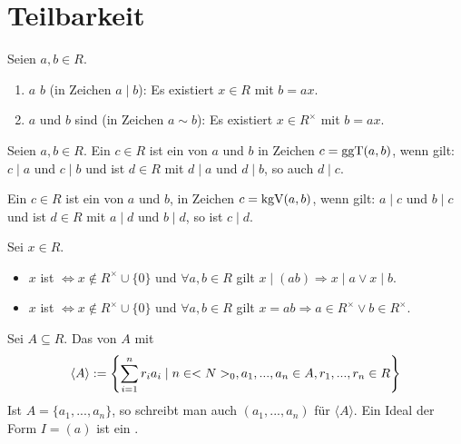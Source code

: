 \section{Teilbarkeit}

\begin{definition}[Teilbarkeit]
	Seien $a,b\in R$.
	\begin{enumerate}
		\item $a$  $b$ (in Zeichen $a\mid b$): Es existiert $x\in R$ mit $b=ax$.
		\item $a$ und $b$ sind  (in Zeichen $a\sim b$): Es existiert $x\in R^{\times}$ mit $b=ax$.
	\end{enumerate}
\end{definition}

\begin{definition}
	Seien $a,b\in R$. Ein $c\in R$ ist ein  von $a$ und $b$ in Zeichen $c=\operatorname{ggT}(a,b)$, wenn gilt: $c\mid a$ und $c\mid b$ und ist $d\in R$ mit $d\mid a$ und $d\mid b$, so auch $d\mid c$.
	
	Ein $c\in R$ ist ein  von $a$ und $b$, in Zeichen $c=\operatorname{kgV}(a,b)$, wenn gilt: $a\mid c$ und $b\mid c$ und ist $d\in R$ mit $a\mid d$ und $b\mid d$, so ist $c\mid d$.
\end{definition}

\begin{definition}
	Sei $x\in R$. 
	\begin{itemize}
		\item $x$ ist  $\iff x\notin R^\times\cup \{0\}$ und $\forall a,b\in R$ gilt $x\mid (ab)\Rightarrow x\mid a\lor x\mid b$.
		\item $x$ ist  $\iff x\notin R^\times\cup \{0\}$ und $\forall a,b\in R$ gilt $x=ab\Rightarrow a\in R^\times \lor b\in R^\times$.
	\end{itemize}
\end{definition}

\begin{definition}
	Sei $A\subseteq R$. Das von $A$  mit
	\begin{align}
		\langle A\rangle :=\left\lbrace \sum_{i=1}^n r_ia_i\mid n\in <N>_0,a_1,...,a_n\in A,r_1,...,r_n\in R\right\rbrace \notag
	\end{align}
	Ist $A=\{a_1,...,a_n\}$, so schreibt man auch $(a_1,...,a_n)$ für $\langle A\rangle$. Ein Ideal der Form $I=(a)$ ist ein .
\end{definition}
